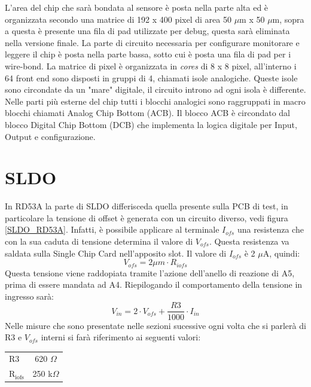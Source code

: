 L'area del chip che sarà bondata al sensore è posta nella parte alta ed è organizzata secondo una matrice di 192 x 400 pixel di area 50 $\mu$m x 50 $\mu$m, sopra a questa è presente una fila di pad utilizzate per debug, questa sarà eliminata nella versione finale. La parte di circuito necessaria per configurare monitorare e leggere il chip è posta nella parte bassa, sotto cui è posta una fila di pad per i wire-bond. 
La matrice di pixel è organizzata in \textit{cores} di 8 x 8 pixel, all'interno i 64 front end sono disposti in gruppi di 4, chiamati isole analogiche. 
Queste isole sono circondate da un "mare" digitale, il circuito introno ad ogni isola è differente. 
Nelle parti più esterne del chip tutti i blocchi analogici sono raggruppati in macro blocchi chiamati Analog Chip Bottom (ACB). Il blocco ACB è circondato dal blocco Digital Chip Bottom (DCB) che implementa la logica digitale per Input, Output e configurazione.

\section{SLDO}
In RD53A la parte di SLDO differisceda quella presente sulla PCB di test, in particolare la tensione di offset è generata con un circuito diverso, vedi figura \ref{SLDO_RD53A}. Infatti, è possibile applicare al terminale $I_{ofs}$ una resistenza che con la sua caduta di tensione determina il valore di $V_{ofs}$. 
Questa resistenza va saldata sulla Single Chip Card nell'apposito slot. Il valore di $I_{ofs}$ è 2 $\mu$A, quindi:
\begin{equation}
V_{ofs} = 2 \mu m \cdot R_{iofs}
\end{equation}
Questa tensione viene raddopiata tramite l'azione dell'anello di reazione di A5, prima di essere mandata ad A4.
Riepilogando il comportamento della tensione in ingresso sarà:
\begin{equation}
V_{in}= 2 \cdot V_{ofs} + \dfrac{R3}{1000} \cdot I_{in}
\end{equation}
Nelle misure che sono presentate nelle sezioni sucessive ogni volta che si parlerà di R3 e $V_{ofs}$ interni si farà riferimento ai seguenti valori:

\begin{center}
\begin{tabular}{lc}
\hline
$\mathrm{R3}$ & 620 $\Omega$ \\
$\mathrm{R_{iofs}}$ & 250 k$\Omega$\\ 
\hline
\end{tabular}
\end{center}

